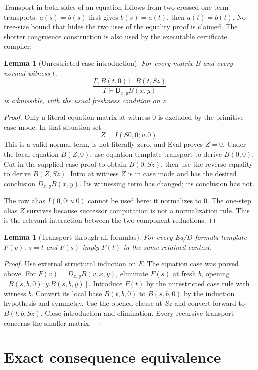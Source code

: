 \documentclass[11pt]{article}
\newtheorem{lemma}[theorem]{Lemma}
\theoremstyle{definition}
\newcommand{\D}{\mathsf D}
\begin{document}
Transport in both sides of an equation follows from two crossed one-term
transports: $a(s)=b(s)$ first gives $b(s)=a(t)$, then $a(t)=b(t)$.
No tree-size bound that hides the two uses of the equality proof is claimed.
The shorter congruence construction is also used by the executable
certificate compiler.

\begin{lemma}[Unrestricted case introduction]\label{lem:cases}
For every matrix $B$ and every normal witness $t$,
\[
\frac{\Gamma,B(t,0)\vdash B(t,Sz)}
     {\Gamma\vdash\D_{x,y}B(x,y)}
\]
is admissible, with the usual freshness condition on $z$.
\end{lemma}
\begin{proof}
Only a literal equation matrix at witness $0$ is excluded by the primitive
case mode. In that situation set
\[
                  Z=I(S0,0;u.0).
\]
This is a valid normal term, is not literally zero, and Eval proves
$Z=0$. Under the local equation $B(Z,0)$, use equation-template
transport to derive $B(0,0)$. Cut in the supplied case proof to obtain
$B(0,Sz)$, then use the reverse equality to derive $B(Z,Sz)$.
Intro at witness $Z$ is in case mode and has the desired conclusion
$D_{x,y}B(x,y)$. Its witnessing term has changed; its conclusion has not.

The raw alias $I(0,0;u.0)$ cannot be used here: it normalizes to $0$.
The one-step alias $Z$ survives because successor computation is not a
normalization rule. This is the relevant interaction between the two
component reductions.
\end{proof}

\begin{lemma}[Transport through all formulas]\label{lem:formula-transport}
For every Eq/$D$ formula template $F(v)$, $s=t$ and $F(s)$ imply
$F(t)$ in the same retained context.
\end{lemma}
\begin{proof}
Use external structural induction on $F$. The equation case was proved
above. For $F(v)=D_{x,y}B(v,x,y)$, eliminate $F(s)$ at fresh $b$,
opening $[B(s,b,0);y.B(s,b,y)]$. Introduce $F(t)$ by the unrestricted
case rule with witness $b$. Convert its local base $B(t,b,0)$ to
$B(s,b,0)$ by the induction hypothesis and symmetry. Use the opened
clause at $Sz$ and convert forward to $B(t,b,Sz)$. Close introduction
and elimination. Every recursive transport concerns the smaller matrix.
\end{proof}

\section{Exact consequence equivalence}
\end{document}
